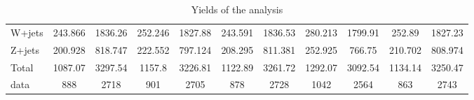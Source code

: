 \documentclass[10pt]{article}
\begin{document}
\begin{table}[htbp]
\begin{center}
\begin{tabular}{|l|S|S|S|S|S|S|S|S|S|S|}
  W+jets   & 243.866  & 1836.26  & 252.246  & 1827.88  & 243.591  & 1836.53  & 280.213  & 1799.91  & 252.89  & 1827.23  \\ 
  Z+jets   & 200.928  & 818.747  & 222.552  & 797.124  & 208.295  & 811.381  & 252.925  & 766.75  & 210.702  & 808.974  \\ 
\hline 
  Total  & 1087.07  & 3297.54  & 1157.8  & 3226.81  & 1122.89  & 3261.72  & 1292.07  & 3092.54  & 1134.14  & 3250.47  \\ 
\hline 
  data   & 888 & 2718 & 901 & 2705 & 878 & 2728 & 1042 & 2564 & 863 & 2743 \\ 
\hline 
\end{tabular} 
\caption{Yields of the analysis} 
\end{center} 
\end{table} 
\end{document}
